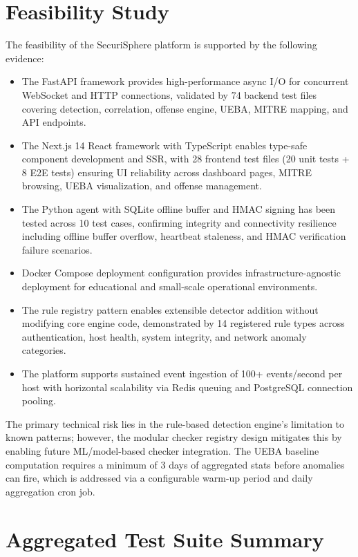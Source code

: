 \section{Feasibility Study}

The feasibility of the SecuriSphere platform is supported by the following evidence:

\begin{itemize}
    \item The FastAPI framework provides high-performance async I/O for concurrent WebSocket and HTTP connections, validated by 74 backend test files covering detection, correlation, offense engine, UEBA, MITRE mapping, and API endpoints.
    \item The Next.js 14 React framework with TypeScript enables type-safe component development and SSR, with 28 frontend test files (20 unit tests + 8 E2E tests) ensuring UI reliability across dashboard pages, MITRE browsing, UEBA visualization, and offense management.
    \item The Python agent with SQLite offline buffer and HMAC signing has been tested across 10 test cases, confirming integrity and connectivity resilience including offline buffer overflow, heartbeat staleness, and HMAC verification failure scenarios.
    \item Docker Compose deployment configuration provides infrastructure-agnostic deployment for educational and small-scale operational environments.
    \item The rule registry pattern enables extensible detector addition without modifying core engine code, demonstrated by 14 registered rule types across authentication, host health, system integrity, and network anomaly categories.
    \item The platform supports sustained event ingestion of 100+ events/second per host with horizontal scalability via Redis queuing and PostgreSQL connection pooling.
\end{itemize}

The primary technical risk lies in the rule-based detection engine's limitation to known patterns; however, the modular checker registry design mitigates this by enabling future ML/model-based checker integration. The UEBA baseline computation requires a minimum of 3 days of aggregated stats before anomalies can fire, which is addressed via a configurable warm-up period and daily aggregation cron job.

\section{Aggregated Test Suite Summary}

